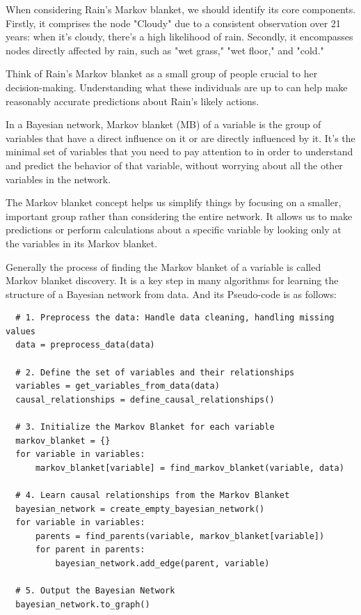 \documentclass{article}
\begin{document}
When considering Rain's Markov blanket, we should identify its core components. Firstly, it comprises the node "Cloudy" due to a consistent observation over 21 years: when it's cloudy, there's a high likelihood of rain. Secondly, it encompasses nodes directly affected by rain, such as "wet grass," "wet floor," and "cold."

Think of Rain's Markov blanket as a small group of people crucial to her decision-making. Understanding what these individuals are up to can help make reasonably accurate predictions about Rain's likely actions.

In a Bayesian network, Markov blanket (MB) of a variable is the group of variables that have a direct influence on it or are directly influenced by it. It's the minimal set of variables that you need to pay attention to in order to understand and predict the behavior of that variable, without worrying about all the other variables in the network.

The Markov blanket concept helps us simplify things by focusing on a smaller, important group rather than considering the entire network. It allows us to make predictions or perform calculations about a specific variable by looking only at the variables in its Markov blanket.

Generally the process of finding the Markov blanket of a variable is called Markov blanket discovery. It is a key step in many algorithms for learning the structure of a Bayesian network from data. And its Pseudo-code is as follows:
\begin{lstlisting}
  # 1. Preprocess the data: Handle data cleaning, handling missing values
  data = preprocess_data(data)
  
  # 2. Define the set of variables and their relationships
  variables = get_variables_from_data(data)
  causal_relationships = define_causal_relationships()
  
  # 3. Initialize the Markov Blanket for each variable
  markov_blanket = {}
  for variable in variables:
      markov_blanket[variable] = find_markov_blanket(variable, data)
  
  # 4. Learn causal relationships from the Markov Blanket
  bayesian_network = create_empty_bayesian_network()
  for variable in variables:
      parents = find_parents(variable, markov_blanket[variable])
      for parent in parents:
          bayesian_network.add_edge(parent, variable)
  
  # 5. Output the Bayesian Network
  bayesian_network.to_graph()
  \end{lstlisting}
\end{document}
